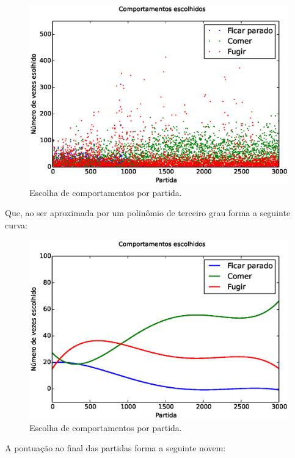 \begin{figure}[H]
    \centering
    \includegraphics[width=170mm]{images/3_behaviors_small_map/chosen_behaviors}
    \caption{\label{img:3ComportamentosMapaPequeno:ComportamentosEscolhidos}Escolha de comportamentos por partida.}
\end{figure}

Que, ao ser aproximada por um polinômio de terceiro grau forma a seguinte curva:

\begin{figure}[H]
    \centering
    \includegraphics[width=170mm]{images/3_behaviors_small_map/chosen_behaviors_pol}
    \caption{\label{img:3ComportamentosMapaPequeno:ComportamentosEscolhidosPolinômio}Escolha de comportamentos por partida.}
\end{figure}

A pontuação ao final das partidas forma a seguinte novem:

